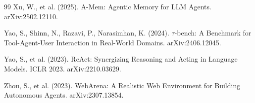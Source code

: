 \documentclass[11pt]{article}
\begin{document}
\begin{thebibliography}{99}
Xu, W., et al. (2025). A-Mem: Agentic Memory for LLM Agents.
arXiv:2502.12110.

Yao, S., Shinn, N., Razavi, P., Narasimhan, K. (2024). $\tau$-bench: A
Benchmark for Tool-Agent-User Interaction in Real-World Domains.
arXiv:2406.12045.

Yao, S., et al. (2023). ReAct: Synergizing Reasoning and Acting in Language
Models. ICLR 2023. arXiv:2210.03629.

Zhou, S., et al. (2023). WebArena: A Realistic Web Environment for Building
Autonomous Agents. arXiv:2307.13854.

\end{thebibliography}
\end{document}
